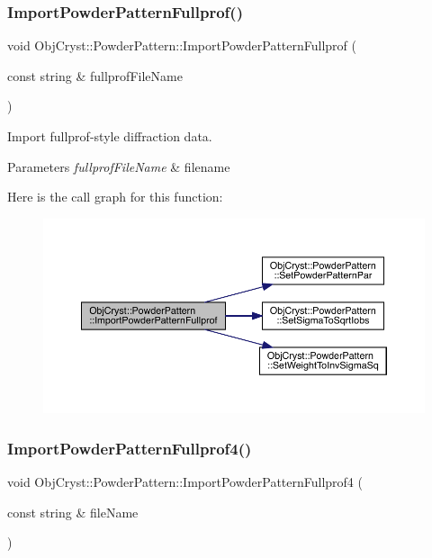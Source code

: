 \subsubsection{\texorpdfstring{ImportPowderPatternFullprof()}{ImportPowderPatternFullprof()}}
{\footnotesize\ttfamily void Obj\+Cryst\+::\+Powder\+Pattern\+::\+Import\+Powder\+Pattern\+Fullprof (\begin{DoxyParamCaption}\item[{const string \&}]{fullprof\+File\+Name }\end{DoxyParamCaption})}



Import fullprof-\/style diffraction data. 


\begin{DoxyParams}{Parameters}
{\em fullprof\+File\+Name} & filename \\
\hline
\end{DoxyParams}
Here is the call graph for this function\+:
\nopagebreak
\begin{figure}[H]
\begin{center}
\leavevmode
\includegraphics[width=350pt]{class_obj_cryst_1_1_powder_pattern_a4499e38a96db3f3c0abdb6d30f3400e1_cgraph}
\end{center}
\end{figure}
\mbox{\label{class_obj_cryst_1_1_powder_pattern_a272b9fd71a6925eb9e1a991e488259b4}} 
\subsubsection{\texorpdfstring{ImportPowderPatternFullprof4()}{ImportPowderPatternFullprof4()}}
{\footnotesize\ttfamily void Obj\+Cryst\+::\+Powder\+Pattern\+::\+Import\+Powder\+Pattern\+Fullprof4 (\begin{DoxyParamCaption}\item[{const string \&}]{file\+Name }\end{DoxyParamCaption})}



